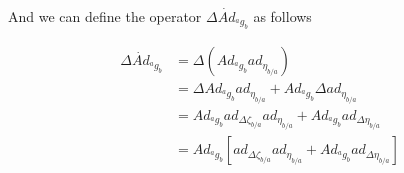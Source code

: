 \documentclass[12pt,a4paper]{book}
\newcommand{\agb}{\ensuremath{{^a g _b}}}
\newcommand{\etaba}{\ensuremath{{\eta_{b/a}}}}
\newcommand{\Adagb}{\ensuremath{Ad_{\agb}}}
\newcommand{\dotAdagb}{\ensuremath{\dot{Ad}_{\agb}}}
\newcommand{\adetaba}{\ensuremath{ad_{\etaba}}}
\newcommand{\Dzetaba}{\ensuremath{{\Delta \zeta_{b/a}}}}
\newcommand{\adDzetaba}{\ensuremath{ad_{\Dzetaba}}}
\begin{document}
And we can define the operator $\Delta \dotAdagb$  as follows

\begin{equation}
\begin{aligned}
	\Delta \dotAdagb 	&= \Delta  \left( \Adagb \adetaba \right)  \\
		&=  \Delta \Adagb \adetaba +  \Adagb \Delta \adetaba \\
		&= \Adagb \adDzetaba \adetaba + \Adagb ad_{\Delta \etaba} \\
		&= \Adagb \left[ \adDzetaba \adetaba + \Adagb ad_{\Delta \etaba} \right]
\end{aligned}
\end{equation}


\end{document}
